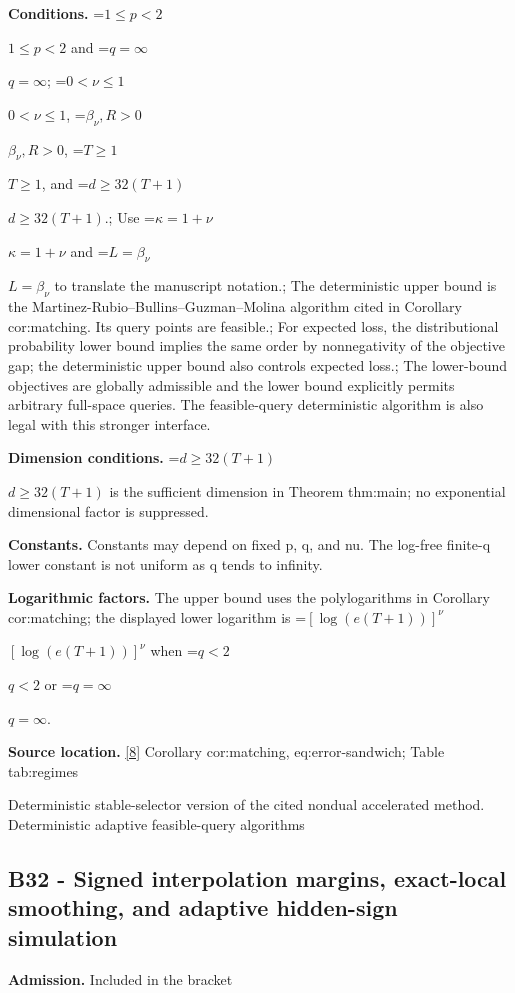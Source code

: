 \documentclass[10pt,a4paper]{article}
\newcommand{\AtlasMath}[1]{\par\begingroup\centering\setbox0=\hbox{$\displaystyle #1$}\ifdim\wd0>1.4\linewidth\typeout{ATLAS WIDE FORMULA: \the\wd0}\fi\ifdim\wd0>\linewidth\resizebox{\linewidth}{!}{\box0}\else\box0\fi\par\endgroup}
\newcommand{\AtlasInlineMath}[1]{\begingroup\setbox0=\hbox{$#1$}\ifdim\wd0>.4\linewidth\endgroup\AtlasMath{#1}\else\endgroup$#1$\fi}
\begin{document}
\textbf{Conditions.} \AtlasInlineMath{1\le p<2} and \AtlasInlineMath{q=\infty}; \AtlasInlineMath{0<\nu\le1}, \AtlasInlineMath{\beta_\nu,R>0}, \AtlasInlineMath{T\ge1}, and \AtlasInlineMath{d\ge32(T+1)}.; Use \AtlasInlineMath{\kappa=1+\nu} and \AtlasInlineMath{L=\beta_\nu} to translate the manuscript notation.; The deterministic upper bound is the Martinez-Rubio--Bullins--Guzman--Molina algorithm cited in Corollary cor:matching. Its query points are feasible.; For expected loss, the distributional probability lower bound implies the same order by nonnegativity of the objective gap; the deterministic upper bound also controls expected loss.; The lower-bound objectives are globally admissible and the lower bound explicitly permits arbitrary full-space queries. The feasible-query deterministic algorithm is also legal with this stronger interface.



\textbf{Dimension conditions.} \AtlasInlineMath{d\ge32(T+1)} is the sufficient dimension in Theorem thm:main; no exponential dimensional factor is suppressed.



\textbf{Constants.} Constants may depend on fixed p, q, and nu. The log-free finite-q lower constant is not uniform as q tends to infinity.



\textbf{Logarithmic factors.} The upper bound uses the polylogarithms in Corollary cor:matching; the displayed lower logarithm is \AtlasInlineMath{[\log(e(T+1))]^\nu} when \AtlasInlineMath{q<2} or \AtlasInlineMath{q=\infty}.



\textbf{Source location.} \href{https://github.com/WU-Wendao/Colombo/blob/main/colombo_sensorium/Complexity_altas/data/sources/colombo/B1/manuscript.pdf}{[8]} Corollary cor:matching, eq:error-sandwich; Table tab:regimes



Deterministic stable-selector version of the cited nondual accelerated method. Deterministic adaptive feasible-query algorithms



\subsection{B32 - Signed interpolation margins, exact-local smoothing, and adaptive hidden-sign simulation}


\textbf{Admission.} Included in the bracket
\end{document}
